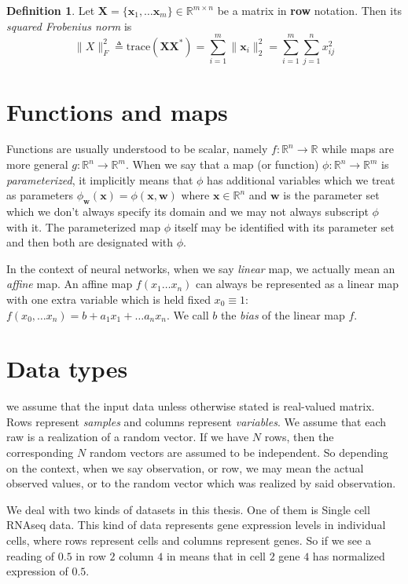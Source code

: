\documentclass[11pt, a4paper]{report}
\theoremstyle{plain}
\theoremstyle{definition}
\newtheorem{mydef}{Definition}[chapter]
\theoremstyle{remark}
\newcommand{\R}{\mathbb{R}}
\newcommand{\X}{\mathbf{X}}
\newcommand{\x}{\mathbf{x}}
\newcommand{\w}{\mathbf{w}}
\begin{document}
\begin{mydef}
Let $\X = \{\x_1, \dots \x_m\} \in \R^{m \times n}$
be a matrix in \textbf{row} notation. Then its \emph{squared Frobenius norm} is
\begin{equation}
\label{def:frobnorm}
\|X\|_F^2 \triangleq \text{trace}(\X \X^*) 
= \sum_{i=1}^{m} \|\x_i\|^2_2 = \sum_{i=1}^m \sum_{j=1}^n x_{ij}^2
\end{equation}
\end{mydef}



\section{Functions and maps}
\label{seq:functions}
Functions are usually understood to be scalar, namely $f:\R^n \to \R$ while maps
are more general $g:\R^n \to \R^m$. When we say that a map (or function) $\phi
:\R^n \to \R^m$ is \emph{parameterized}, it implicitly means that $\phi$ has
additional variables which we treat as parameters $\phi_{\w}(\x) = \phi(\x, \w)$
where $\x \in \R^n$ and $\w$ is the parameter set which we don't always specify
its domain and we may not always subscript $\phi$ with it. The parameterized map
$\phi$ itself may be identified with its parameter set and then both are
designated with $\phi$.

In the context of neural networks, when we say \emph{linear} map, we actually
mean an \emph{affine} map. An affine map $f(x_1 \dots x_n)$ can always be
represented as a linear map with one extra variable which is held fixed $x_0
\equiv 1$: $f(x_0, \dots x_n) = b + a_1 x_1 + \dots a_n x_n$. We call $b$ the
\emph{bias} of the linear map $f$.
\label{affinelinear}

\section{Data types}
we assume that the input data unless otherwise stated is real-valued matrix.
Rows represent \emph{samples} and columns represent \emph{variables}. We assume
that each raw is a realization of a random vector. If we have $N$ rows, then the
corresponding $N$ random vectors are assumed to be independent. So depending on
the context, when we say observation, or row, we may mean the actual observed
values, or to the random vector which was realized by said observation.

We deal with two kinds of datasets in this thesis. One of them is Single cell
RNAseq data. This kind of data represents gene expression levels in individual
cells, where rows represent cells and columns represent genes. So if we see a
reading of $0.5$ in row $2$ column $4$ in means that in cell $2$ gene $4$ has
normalized expression of $0.5$.
\end{document}
